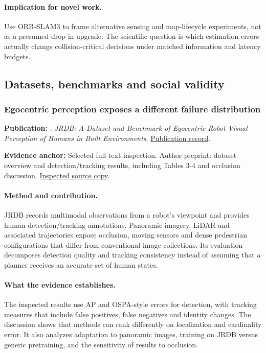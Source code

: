 \paragraph{Implication for novel work.} Use ORB-SLAM3 to frame alternative sensing and map-lifecycle experiments, not as a presumed drop-in upgrade. The scientific question is which estimation errors actually change collision-critical decisions under matched information and latency budgets.

\subsection{Datasets, benchmarks and social validity}
\subsubsection{Egocentric perception exposes a different failure distribution}\label{paper:jrdb}
\textbf{Publication:} \citet{jrdb}. \emph{JRDB: A Dataset and Benchmark of Egocentric Robot Visual Perception of Humans in Built Environments}. \href{https://doi.org/10.1109/tpami.2021.3070543}{Publication record}.

\textbf{Evidence anchor:} Selected full-text inspection. Author preprint: dataset overview and detection/tracking results, including Tables 3-4 and occlusion discussion. \href{https://arxiv.org/pdf/1910.11792}{Inspected source copy}.

\paragraph{Method and contribution.} JRDB records multimodal observations from a robot's viewpoint and provides human detection/tracking annotations. Panoramic imagery, LiDAR and associated trajectories expose occlusion, moving sensors and dense pedestrian configurations that differ from conventional image collections. Its evaluation decomposes detection quality and tracking consistency instead of assuming that a planner receives an accurate set of human states.

\paragraph{What the evidence establishes.} The inspected results use AP and OSPA-style errors for detection, with tracking measures that include false positives, false negatives and identity changes. The discussion shows that methods can rank differently on localization and cardinality error. It also analyzes adaptation to panoramic images, training on JRDB versus generic pretraining, and the sensitivity of results to occlusion.

